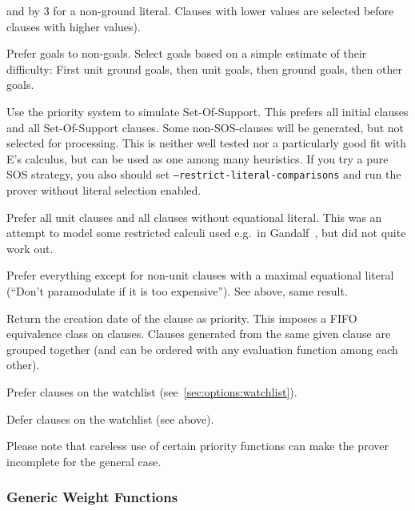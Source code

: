 \documentclass{report}
\begin{document}
\begin{description}
  and by 3 for a non-ground literal. Clauses with lower values are
  selected before clauses with higher values).
\item[\texttt{ByGoalDifficulty}:] Prefer goals to non-goals. Select
  goals based on a simple estimate of their difficulty: First unit
  ground goals, then unit goals, then ground goals, then other goals.
\item[\texttt{SimulateSOS}:] Use the priority system to simulate
  Set-Of-Support. This prefers all initial clauses and all
  Set-Of-Support clauses. Some non-SOS-clauses will be generated, but
  not selected for processing. This is neither well tested nor
  a particularly good fit with E's calculus, but can be used as one
  among many heuristics. If you try a pure SOS strategy, you also
  should set \texttt{--restrict-literal-comparisons} and run the
  prover without literal selection enabled.
\item[\texttt{PreferUnitAndNonEq}:] Prefer all unit clauses and all
  clauses without equational literal. This was an attempt to model
  some restricted calculi used e.g.~in Gandalf~\cite{Tammet:JAR-97},
  but did not quite work out.
\item[\texttt{DeferNonUnitMaxEq}:] Prefer everything except for
  non-unit clauses with a maximal equational literal (``Don't
  paramodulate if it is too expensive''). See above, same result.
\item[\texttt{ByCreationDate}:] Return the creation date of the clause
  as priority. This imposes a FIFO equivalence class on
  clauses. Clauses generated from the same given clause are grouped
  together (and can be ordered with any evaluation function among each
  other).
\item[\texttt{PreferWatchlist}:] Prefer clauses on the watchlist
  (see~\ref{sec:options:watchlist}).
\item[\texttt{DeferWatchlist}:] Defer clauses on the watchlist (see
  above).
\end{description}

Please note that careless use of certain priority functions can make
the prover incomplete for the general case.


\subsubsection{Generic Weight Functions}
\end{document}
